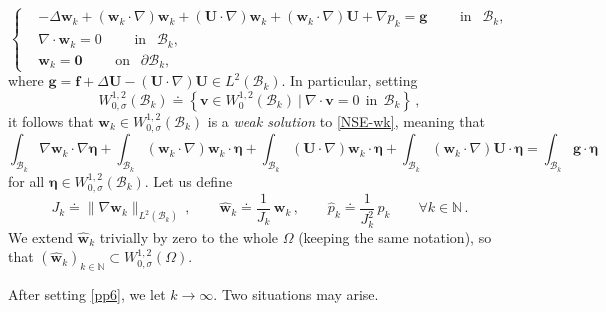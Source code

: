 \documentclass[11pt]{article}
\numberwithin{equation}{section}
\numberwithin{figure}{section}
\def\hp{\widehat{p}}
\def\bbe{{\boldsymbol{\eta}}}
\def\0{{\mathbf 0}}
\begin{document}
\begin{equation}  \label{NSE-wk}
\left\{
\begin{aligned}
&- \Delta \mathbf{w}_k + (\mathbf{w}_k \cdot \nabla) \mathbf{w}_k + (\mathbf{U} \cdot \nabla) \mathbf{w}_k +(\mathbf{w}_k \cdot \nabla) \mathbf{U} + \nabla p_k = \mathbf{g}\qquad\mbox{ in }\ \ \mathcal{B}_k, \\
& \nabla \cdot \mathbf{w}_k = 0\qquad\mbox{ in }\  \ \mathcal{B}_k, \\
&\mathbf{w}_k = \0 \qquad\mbox{ on }\ \ \partial  \mathcal{B}_k,
\end{aligned}
\right.
\end{equation}
where $\mathbf{g}=\mathbf{f}+\Delta\mathbf{U}-(\mathbf{U}\cdot\nabla)\mathbf{U}\in L^2(\mathcal{B}_k)$. In particular, setting
$$
W^{1,2}_{0,\sigma}(\mathcal{B}_k) \doteq \left\lbrace \mathbf{v} \in W_{0}^{1,2}(\mathcal{B}_k) \ \big| \ \nabla \cdot \mathbf{v} = 0 \ \ \mbox{in} \ \ \mathcal{B}_k \right\rbrace \, ,
$$
it follows that $\mathbf{w}_{k} \in W_{0,\sigma}^{1,2}(\mathcal{B}_k)$ is a \textit{weak solution} to \eqref{NSE-wk}, meaning that
\begin{equation} \label{weaksolutionsh}
	\int_{\mathcal{B}_k} \nabla \mathbf{w}_{k} \cdot \nabla \bbe + \int_{\mathcal{B}_k} (\mathbf{w}_{k} \cdot \nabla)\mathbf{w}_{k} \cdot \bbe +
	\int_{\mathcal{B}_k} (\mathbf{U} \cdot \nabla) \mathbf{w}_{k} \cdot \bbe + \int_{\mathcal{B}_k} (\mathbf{w}_{k} \cdot \nabla) \mathbf{U}\cdot
	\bbe = \int_{\mathcal{B}_k} \mathbf{g} \cdot \bbe
\end{equation}
for all $\bbe \in W^{1,2}_{0,\sigma}(\mathcal{B}_k)$. Let us define
\begin{equation}  \label{pp6}
	J_k \doteq \| \nabla \mathbf{w}_{k} \|_{L^{2}(\mathcal{B}_k)} \, ,\qquad \widehat{\mathbf{w}}_k\doteq\frac1{J_k} \, \mathbf{w}_{k} \, , \qquad \hp_k\doteq\frac1{J^2_k} \, p_k \qquad \forall k \in \mathbb{N} \, .
\end{equation}
We extend $\widehat{\mathbf{w}}_k$ trivially by zero to the whole $\Omega$ (keeping the same notation), so that
$(\widehat{\mathbf{w}}_{k})_{k  \in \mathbb{N}}  \subset W_{0,\sigma}^{1,2}(\Omega)$.

After setting \eqref{pp6}, we let $k \to \infty$. Two situations may arise.
\newline
\end{document}
